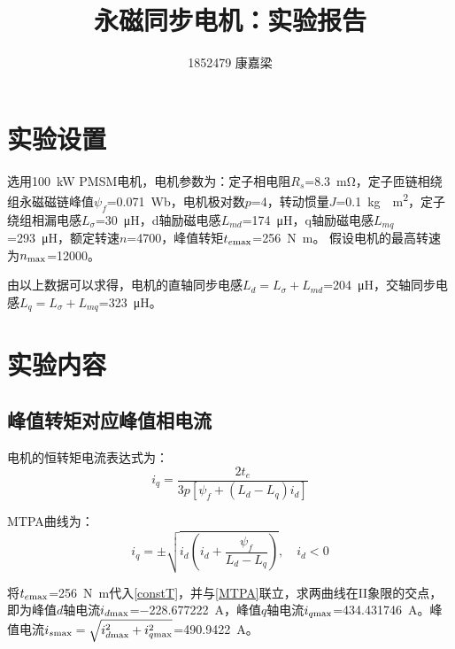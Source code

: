 \documentclass[UTF8]{ctexart}
\title{永磁同步电机：实验报告}
\author{1852479 康嘉梁}
\date{}
\numberwithin{figure}{section}
\numberwithin{table}{section}
\begin{document}
\maketitle
\tableofcontents

\clearpage


\section{实验设置}

选用\SI{100}{\kilo\watt} PMSM电机，电机参数为：定子相电阻$R_s$=\SI{8.3}{\milli\ohm}，定子匝链相绕组永磁磁链峰值$\psi_f$=\SI{0.071}{\weber}，电机极对数$p$=4，转动惯量$J$=\SI{0.1}{\kilo\gram\cdot\metre\squared}，定子绕组相漏电感$L_\sigma$=\SI{30}{\micro\henry}，d轴励磁电感$L_{md}$=\SI{174}{\micro\henry}，q轴励磁电感$L_{mq}$=\SI{293}{\micro\henry}，额定转速$n$=\SI{4700}{\rpm}，峰值转矩$t_{e\rm max}$=\SI[inter-unit-product=\ensuremath{\cdot}]{256}{\newton\metre}。
假设电机的最高转速为$n_{\rm max}$=\SI{12000}{\rpm}。

由以上数据可以求得，电机的直轴同步电感$L_d=L_\sigma+L_{md}$=\SI{204}{\micro\henry}，交轴同步电感$L_q=L_\sigma+L_{mq}$=\SI{323}{\micro\henry}。


\section{实验内容}

\subsection{峰值转矩对应峰值相电流}
\label{subsection:2.1}

电机的恒转矩电流表达式\cite{b}为：
\begin{equation}
	i_q=\frac{2t_e}{3p[\psi_f+(L_d-L_q)i_d]}\label{constT}
\end{equation}

MTPA曲线\cite{b}为：
\begin{equation}
	i_q=\pm\sqrt{i_d\left(i_d+\frac{\psi_f}{L_d-L_q}\right)},\quad i_d<0\label{MTPA}
\end{equation}

将$t_{e\rm max}$=\SI[inter-unit-product=\ensuremath{\cdot}]{256}{\newton\metre}代入\cref{constT}，并与\cref{MTPA}联立，求两曲线在II象限的交点，即为峰值$d$轴电流$i_{d\rm max}$=\SI[round-mode=places,round-precision=2]{-228.677222}{\ampere}，峰值$q$轴电流$i_{q\rm max}$=\SI[round-mode=places,round-precision=2]{434.431746}{\ampere}。峰值电流$i_{s\rm max}=\sqrt{i_{d\rm max}^2+i_{q\rm max}^2}$=\SI[round-mode=places,round-precision=2]{490.9422}{\ampere}。
\end{document}
